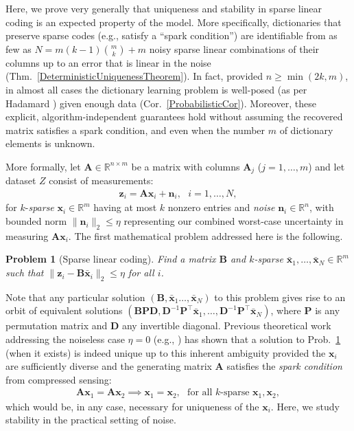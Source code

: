 \documentclass[9pt,twocolumn]{pnas-new}
\newtheorem{problem}{Problem}
\begin{document}
Here, we prove very generally that uniqueness and stability in sparse linear coding is an expected property of the model. 
More specifically, dictionaries that preserve sparse codes (e.g., satisfy a ``spark condition'') are identifiable from as few as \mbox{$N = m(k-1){m \choose k} + m$} noisy sparse linear combinations of their columns up to an error that is linear in the noise (Thm.~\ref{DeterministicUniquenessTheorem}). In fact, provided $n \geq \min(2k,m)$, in almost all cases the dictionary learning problem is well-posed (as per Hadamard \cite{Hadamard1902}) given enough data (Cor.~\ref{ProbabilisticCor}). Moreover, these explicit, algorithm-independent guarantees hold without assuming the recovered matrix satisfies a spark condition, and even when the number $m$ of dictionary elements is unknown.

More formally, let $\mathbf{A} \in \mathbb R^{n \times m}$ be a matrix with columns $\mathbf{A}_j$ ($j = 1,\ldots,m$) and let dataset $Z$ consist of measurements:
\begin{align}\label{LinearModel}
\mathbf{z}_i = \mathbf{A}\mathbf{x}_i + \mathbf{n}_i,\ \ \  \text{$i=1,\ldots,N$},
\end{align}
for $k$-\emph{sparse} $\mathbf{x}_i \in \mathbb{R}^m$ having at most $k$ nonzero entries and \emph{noise} $\mathbf{n}_i \in \mathbb{R}^n$, with bounded norm $\| \mathbf{n}_i \|_2 \leq  \eta$ representing our combined worst-case uncertainty in  measuring $\mathbf{A}\mathbf{x}_i$.
The first mathematical problem addressed here is the following.

\begin{problem}[Sparse linear coding]\label{InverseProblem}
Find a matrix $\mathbf{B}$ and $k$-sparse $\mathbf{\bar x}_1, \ldots, \mathbf{\bar x}_N \in \mathbb{R}^m$ such that $\|\mathbf{z}_i - \mathbf{B}\mathbf{\bar x}_i\|_2 \leq \eta$ for all $i$.
\end{problem}

Note that any particular solution $(\mathbf{B}, \mathbf{\bar x}_1 \ldots, \mathbf{\bar x}_N)$ to this problem gives rise to an orbit of equivalent solutions $(\mathbf{BPD}, \mathbf{D}^{-1}\mathbf{P}^{\top}\mathbf{\bar x}_1, \ldots, \mathbf{D}^{-1}\mathbf{P}^{\top}\mathbf{\bar x}_N)$, where $\mathbf{P}$ is any permutation matrix and $\mathbf{D}$ any invertible diagonal. Previous theoretical work addressing the noiseless case $\eta =0$ (e.g., \cite{li2004analysis, Georgiev05, Aharon06, Hillar15}) has shown that a solution to Prob.~\ref{InverseProblem} (when it exists) is indeed unique up to this inherent ambiguity provided the $\mathbf{x}_i$ are sufficiently diverse and the generating matrix $\mathbf{A}$ satisfies the \textit{spark condition} from compressed sensing:
\begin{align}\label{SparkCondition}
\mathbf{A}\mathbf{x}_1 = \mathbf{A}\mathbf{x}_2 \implies \mathbf{x}_1 = \mathbf{x}_2, \ \ \ \text{for all $k$-sparse } \mathbf{x}_1, \mathbf{x}_2,
\end{align}
%
which would be, in any case, necessary for uniqueness of the $\mathbf{x}_i$. Here, we study stability in the practical setting of noise.
\end{document}
